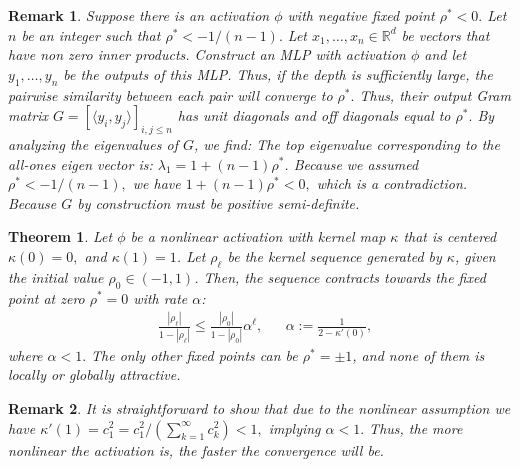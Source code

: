 \documentclass[twoside]{article}
\newcommand{\R}{\mathbb{R}}
\newtheorem{theorem}{Theorem}
\newtheorem{remark}{Remark}
\theoremstyle{definition}
\newcommand{\thomas}[1]{{\color{blue}TH:  \textit{#1}}}
\begin{document}
\begin{remark}\label{rem:no_negative_geometric}
    Suppose there is an activation $\phi$ with negative fixed point $\rho^*<0.$ Let $n$ be an integer such that $\rho^* < -1/(n-1).$ Let $x_1,\dots, x_n\in \R^d$ be vectors that have non zero inner products. Construct an MLP with activation $\phi$ and let $y_1,\dots, y_n$ be the outputs of this MLP. Thus, if the depth is sufficiently large, the pairwise similarity between each pair will converge to $\rho^*.$ Thus, their output Gram matrix $G = [\langle y_i,y_j\rangle]_{i,j\le n}$  has unit diagonals and off diagonals equal to $\rho^*.$ By analyzing the eigenvalues of $G$, we find: The top eigenvalue corresponding to the all-ones eigen vector is: $\lambda_1 = 1 + (n-1)\rho^*$. Because we assumed $\rho^* < -1/(n-1),$ we have $1 + (n-1)\rho^* < 0,$ which is a contradiction. Because $G$ by construction must be positive semi-definite.  
\end{remark}

\begin{theorem}\label{thm:global_attract_centered}
Let $\phi$ be a nonlinear activation with kernel map $\kappa$ that is centered $\kappa(0)=0,$ and $\kappa(1)=1$. 
Let $\rho_\ell$ be the kernel sequence generated by $\kappa$, given the initial value $\rho_0 \in(-1 , 1)$.
Then, the sequence contracts towards the fixed point at zero $\rho^*=0$ with rate $\alpha$:
    \begin{align}
        &\frac{|\rho_\ell|}{1-|\rho_\ell|} \le \frac{|\rho_0|}{1-|\rho_0|}\alpha^{\ell}, && \alpha := \frac{1}{2-\kappa'(0)},
    \end{align}
 where $\alpha<1.$ The only other fixed points can be $\rho^*=\pm 1$, and none of them is locally or globally attractive.
\end{theorem}

\begin{remark}
    It is straightforward to show that due to the nonlinear assumption we have $\kappa'(1) = c_1^2 = c_1^2/(\sum_{k=1}^\infty c_k^2) < 1,$ implying $\alpha < 1.$ Thus, the more nonlinear the activation is, the faster the convergence will be. 
\end{remark}
\end{document}
